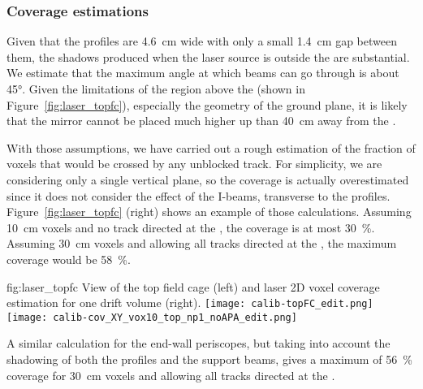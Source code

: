 \subsubsection{Coverage estimations}
\label{sec:lasercoverage}

Given that the  profiles are \SI{4.6}{\cm} wide with only a small \SI{1.4}{\cm} gap between them, the shadows produced when the laser source is outside the  are substantial. We estimate that the maximum angle at which beams can go through is about \ang{45}. Given the limitations of the region above the  (shown in Figure~\ref{fig:laser_topfc}), especially the geometry of the ground plane, it is likely that the mirror cannot be placed much higher up than \SI{40}{\cm} away from the . 

With those assumptions, we have carried out a rough estimation of the fraction of voxels that would be crossed by any unblocked track. For simplicity, we are considering only a single vertical plane, so the coverage is actually overestimated since it does not consider the effect of the  I-beams, transverse to the  profiles.
Figure~\ref{fig:laser_topfc} (right) shows an example of those calculations. Assuming \SI{10}{\cm} voxels and no track directed at the , the coverage is at most \SI{30}{\%}. Assuming \SI{30}{\cm} voxels and allowing all tracks directed at the , the maximum coverage would be \SI{58}{\%}.

\begin{dunefigure}{fig:laser_topfc}
{View of the top field cage (left) and laser 2D voxel coverage estimation for one drift volume (right).}
\texttt{[image: calib-topFC\_edit.png]}
\texttt{[image: calib-cov\_XY\_vox10\_top\_np1\_noAPA\_edit.png]}
\end{dunefigure}

A similar calculation for the end-wall periscopes, but taking into account the shadowing of both the profiles and the support beams, gives a maximum of \SI{56}{\%} coverage for \SI{30}{\cm} voxels and allowing all tracks directed at the .


